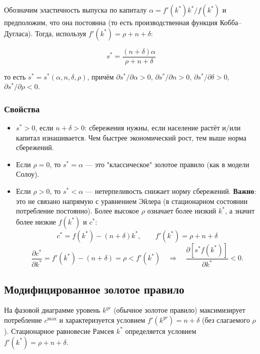 \documentclass[10pt,a4paper]{article}
\begin{document}
Обозначим эластичность выпуска по капиталу $\alpha = f'(k^{*})k^{*}/f(k^{*})$ и предположим, что она постоянна (то есть производственная функция Кобба--Дугласа). Тогда, используя $f'(k^{*}) = \rho+n+\delta$:

\begin{formulabox}
\begin{equation}
s^{*} = \frac{(n+\delta)\alpha}{\rho+n+\delta} \tag{3.17}
\end{equation}
\end{formulabox}

то есть $s^{*} = s^{*}(\alpha, n, \delta, \rho)$, причём $\partial s^*/\partial\alpha>0$, $\partial s^*/\partial n>0$, $\partial s^*/\partial\delta>0$, $\partial s^*/\partial\rho<0$.

\subsubsection{Свойства}

\begin{itemize}[leftmargin=1.3em]
\item $s^{*} > 0$, если $n+\delta > 0$: сбережения нужны, если население растёт и/или капитал изнашивается. Чем быстрее экономический рост, тем выше норма сбережений.
\item Если $\rho = 0$, то $s^{*} = \alpha$ — это "классическое" золотое правило (как в модели Солоу).
\item Если $\rho > 0$, то $s^{*} < \alpha$ — нетерпеливость снижает норму сбережений. \textbf{Важно}: это не связано напрямую с уравнением Эйлера (в стационарном состоянии потребление постоянно). Более высокое $\rho$ означает более низкий $k^*$, а значит более низкие $f(k^*)$ и $c^*$:
$$c^{*} = f(k^{*}) - (n+\delta)k^{*}, \qquad f'(k^{*}) = \rho+n+\delta$$
$$\frac{\partial c^{*}}{\partial k^{*}} = f'(k^{*}) - (n+\delta) = \rho < f'(k^{*}) \quad \Rightarrow \quad \frac{\partial [s^{*}f(k^{*})]}{\partial k^{*}} < 0.$$
\end{itemize}

\subsection{Модифицированное золотое правило}

На фазовой диаграмме уровень $k^{gr}$ (обычное золотое правило) максимизирует потребление $c^{\max}$ и характеризуется условием $f'(k^{gr}) = n+\delta$ (без слагаемого $\rho$). Стационарное равновесие Рамсея $k^{*}$ определяется условием $f'(k^{*}) = \rho+n+\delta$.
\end{document}
